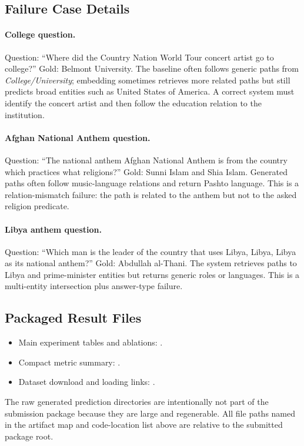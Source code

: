 \documentclass[10pt,twocolumn]{article}
\begin{document}
\subsection{Failure Case Details}
\paragraph{College question.} Question: ``Where did the Country Nation World Tour concert artist go to college?'' Gold: Belmont University. The baseline often follows generic paths from \emph{College/University}; embedding sometimes retrieves more related paths but still predicts broad entities such as United States of America. A correct system must identify the concert artist and then follow the education relation to the institution.

\paragraph{Afghan National Anthem question.} Question: ``The national anthem Afghan National Anthem is from the country which practices what religions?'' Gold: Sunni Islam and Shia Islam. Generated paths often follow music-language relations and return Pashto language. This is a relation-mismatch failure: the path is related to the anthem but not to the asked religion predicate.

\paragraph{Libya anthem question.} Question: ``Which man is the leader of the country that uses Libya, Libya, Libya as its national anthem?'' Gold: Abdullah al-Thani. The system retrieves paths to Libya and prime-minister entities but returns generic roles or languages. This is a multi-entity intersection plus answer-type failure.

\subsection{Packaged Result Files}
\begin{itemize}
  \item Main experiment tables and ablations: .
  \item Compact metric summary: .
  \item Dataset download and loading links: .
\end{itemize}
The raw generated prediction directories are intentionally not part of the submission package because they are large and regenerable. All file paths named in the artifact map and code-location list above are relative to the submitted package root.
\end{document}
